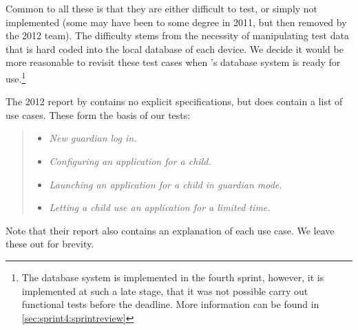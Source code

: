 Common to all these is that they are either difficult to test, or simply not implemented (some may have been to some degree in 2011, but then removed by the 2012 team).
The difficulty stems from the necessity of manipulating test data that is hard coded into the local database of each device. 
We decide it would be more reasonable to revisit these test cases when \giraf's database system is ready for use.\footnote{The database system is implemented in the fourth sprint, however, it is implemented at such a late stage, that it was not possible carry out functional tests before the deadline. More information can be found in \cref{sec:sprint4:sprintreview}}

The 2012 report by \citet{launcher2012} contains no explicit specifications, but does contain a list of use cases. 
These form the basis of our tests:

\begin{quote}
\begin{itemize}
	\item \textit{New guardian log in.}
	\item \textit{Configuring an application for a child.}
	\item \textit{Launching an application for a child in guardian mode.}
	\item \textit{Letting a child use an application for a limited time.}
\end{itemize}
\end{quote}

Note that their report also contains an explanation of each use case. 
We leave these out for brevity.